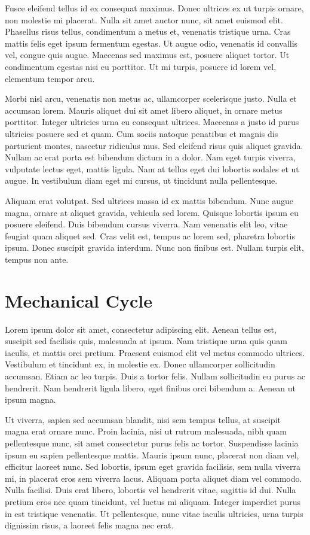 Fusce eleifend tellus id ex consequat maximus. Donec ultrices ex ut turpis ornare, non molestie mi placerat. Nulla sit amet auctor nunc, sit amet euismod elit. Phasellus risus tellus, condimentum a metus et, venenatis tristique urna. Cras mattis felis eget ipsum fermentum egestas. Ut augue odio, venenatis id convallis vel, congue quis augue. Maecenas sed maximus est, posuere aliquet tortor. Ut condimentum egestas nisi eu porttitor. Ut mi turpis, posuere id lorem vel, elementum tempor arcu.

Morbi nisl arcu, venenatis non metus ac, ullamcorper scelerisque justo. Nulla et accumsan lorem. Mauris aliquet dui sit amet libero aliquet, in ornare metus porttitor. Integer ultricies urna eu consequat ultrices. Maecenas a justo id purus ultricies posuere sed et quam. Cum sociis natoque penatibus et magnis dis parturient montes, nascetur ridiculus mus. Sed eleifend risus quis aliquet gravida. Nullam ac erat porta est bibendum dictum in a dolor. Nam eget turpis viverra, vulputate lectus eget, mattis ligula. Nam at tellus eget dui lobortis sodales et ut augue. In vestibulum diam eget mi cursus, ut tincidunt nulla pellentesque.

Aliquam erat volutpat. Sed ultrices massa id ex mattis bibendum. Nunc augue magna, ornare at aliquet gravida, vehicula sed lorem. Quisque lobortis ipsum eu posuere eleifend. Duis bibendum cursus viverra. Nam venenatis elit leo, vitae feugiat quam aliquet sed. Cras velit est, tempus ac lorem sed, pharetra lobortis ipsum. Donec suscipit gravida interdum. Nunc non finibus est. Nullam turpis elit, tempus non ante.

\section{Mechanical Cycle}

Lorem ipsum dolor sit amet, consectetur adipiscing elit. Aenean tellus est, suscipit sed facilisis quis, malesuada at ipsum. Nam tristique urna quis quam iaculis, et mattis orci pretium. Praesent euismod elit vel metus commodo ultrices. Vestibulum et tincidunt ex, in molestie ex. Donec ullamcorper sollicitudin accumsan. Etiam ac leo turpis. Duis a tortor felis. Nullam sollicitudin eu purus ac hendrerit. Nam hendrerit ligula libero, eget finibus orci bibendum a. Aenean ut ipsum magna.

Ut viverra, sapien sed accumsan blandit, nisi sem tempus tellus, at suscipit magna erat ornare nunc. Proin lacinia, nisi ut rutrum malesuada, nibh quam pellentesque nunc, sit amet consectetur purus felis ac tortor. Suspendisse lacinia ipsum eu sapien pellentesque mattis. Mauris ipsum nunc, placerat non diam vel, efficitur laoreet nunc. Sed lobortis, ipsum eget gravida facilisis, sem nulla viverra mi, in placerat eros sem viverra lacus. Aliquam porta aliquet diam vel commodo. Nulla facilisi. Duis erat libero, lobortis vel hendrerit vitae, sagittis id dui. Nulla pretium eros nec quam tincidunt, vel luctus mi aliquam. Integer imperdiet purus in est tristique venenatis. Ut pellentesque, nunc vitae iaculis ultricies, urna turpis dignissim risus, a laoreet felis magna nec erat.

